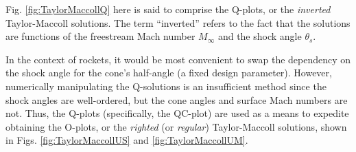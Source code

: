 \documentclass[11pt,dvipsnames]{thesis}
\begin{document}
\noindent
Fig. \ref{fig:TaylorMaccollQ} here is said to comprise the Q-plots, or the \textit{inverted} Taylor-Maccoll solutions. The term ``inverted'' refers to the fact that the solutions are functions of the freestream Mach number $M_\infty$ and the shock angle $\theta_s$.

In the context of rockets, it would be most convenient to swap the dependency on the shock angle for the cone's half-angle (a fixed design parameter). However, numerically manipulating the Q-solutions is an insufficient method since the shock angles are well-ordered, but the cone angles and surface Mach numbers are not. Thus, the Q-plots (specifically, the QC-plot) are used as a means to expedite obtaining the O-plots, or the \textit{righted} (or \textit{regular}) Taylor-Maccoll solutions, shown in Figs. \ref{fig:TaylorMaccollUS} and \ref{fig:TaylorMaccollUM}.
\end{document}

